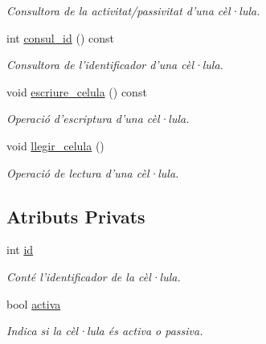 \begin{DoxyCompactItemize}
\begin{DoxyCompactList}\small\item\em Consultora de la activitat/passivitat d'una cèl·lula. \end{DoxyCompactList}\item 
int \hyperlink{class_celula_a521825572a84119f433c77e5707aadd6}{consul\-\_\-id} () const 
\begin{DoxyCompactList}\small\item\em Consultora de l'identificador d'una cèl·lula. \end{DoxyCompactList}\item 
void \hyperlink{class_celula_a75b2519d8063e841dea7b9d6fd1506ab}{escriure\-\_\-celula} () const 
\begin{DoxyCompactList}\small\item\em Operació d'escriptura d'una cèl·lula. \end{DoxyCompactList}\item 
void \hyperlink{class_celula_a8b78a83ccbaa5be1cea1ffd47972279c}{llegir\-\_\-celula} ()
\begin{DoxyCompactList}\small\item\em Operació de lectura d'una cèl·lula. \end{DoxyCompactList}\end{DoxyCompactItemize}
\subsection*{Atributs Privats}
\begin{DoxyCompactItemize}
\item 
int \hyperlink{class_celula_a0984a8b3deeed4979ed6f6141edc3c0c}{id}
\begin{DoxyCompactList}\small\item\em Conté l'identificador de la cèl·lula. \end{DoxyCompactList}\item 
bool \hyperlink{class_celula_a22ec0fe5fde605b5b3067acde093a3f7}{activa}
\begin{DoxyCompactList}\small\item\em Indica si la cèl·lula és activa o passiva. \end{DoxyCompactList}\end{DoxyCompactItemize}
